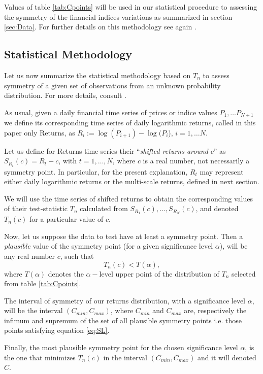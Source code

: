\documentclass{elsarticle}
\begin{document}
Values of table \ref{tab:Cpoints} will be used in our statistical procedure to assessing the symmetry of the financial indices variations as summarized in section \ref{sec:Data}. For further details on this methodology see again \cite{Coronel-Montoya}.

\subsection{Statistical Methodology}
\label{Meth}
Let us now summarize the statistical methodology based on $T_n$ to assess symmetry of a given  set of observations from an unknown probability distribution. For more details, consult \cite{Coronel-Montoya}.

As usual, given a daily financial time series of prices or indice values $P_1,\ldots P_{N+1}$ we define its corresponding time series of daily logarithmic returns, called in this paper only Returns, as $R_i := \log(P_{i+1})-\log(P_i$), $i=1,\ldots N$.

Let us define for Returns time series their ``{\it shifted returns around} $c$'' as $S_{R_{t}}(c)=R_{t}-c$, with $t=1,\ldots,N$, where $c$ is a real number, not necessarily a symmetry point. In particular, for the present explanation, $R_{t}$ may represent either daily logarithmic returns or the multi-scale returns, defined in next section.

We will use the time series of shifted returns to obtain the corresponding values of their test-statistic $T_{n}$ calculated from $S_{R_{1}}(c),\ldots,S_{R_{N}}(c)$, and denoted $T_{n}(c)$ for a particular value of $c$.

Now, let us suppose the data to test have at least a symmetry point. Then a {\em plausible} value of the symmetry point (for a given significance level $\alpha$), will be any real number $c$, such that
\begin{equation}
T_{n}(c)<T(\alpha),
\label{eq:SL}
\end{equation}
where $T(\alpha)$ denotes the $\alpha-$level upper point of the distribution of $T_{n}$ selected from table \ref{tab:Cpoints}.

The interval of symmetry of our returns distribution, with a significance level $\alpha$, will be the interval $(C_{min},C_{max})$, where $C_{min}$ and $C_{max}$ are, respectively the infimum and supremum of the set of all plausible symmetry points i.e. those points satisfying equation \ref{eq:SL}.

Finally, the most plausible symmetry point for the chosen significance level $\alpha$, is the one that minimizes $T_{n}(c)$ in the interval  $(C_{min},C_{max})$ and it will denoted $C$.
\end{document}
